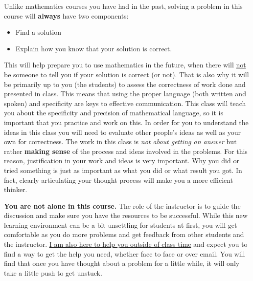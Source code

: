 Unlike mathematics courses you have had in the past, solving a problem in this course will \textbf{always} have two components:
\begin{itemize}
\item Find a solution
\item Explain how you know that your solution is correct.
\end{itemize}
This will help prepare you to use mathematics in the future, when there will \underline{not} be someone to tell you if your solution is correct (or not). That is also why it will be primarily up to you (the students) to assess the correctness of work done and presented in class. This means that using the proper language (both written and spoken) and specificity are keys to effective communication. This class will teach you about the specificity and precision of mathematical language, so it is important that you practice and work on this. In order for you to understand the ideas in this class you will need to evaluate other people's ideas as well as your own for correctness. The work in this class is \emph{not about getting an answer} but rather \textbf{making sense} of the process and ideas involved in the problems. For this reason, justification in your work and ideas is very important. Why you did or tried something is just as important as what you did or what result you got. In fact, clearly articulating your thought process will make you a more efficient thinker.

\textbf{You are not alone in this course.} The role of the instructor is to guide the discussion and make sure you have the resources to be successful. While this new learning environment can be a bit unsettling for students at first, you will get comfortable as you do more problems and get feedback from other students and the instructor. \underline{I am also here to help you outside of class time} and expect you to find a way to get the help you need, whether face to face or over email. You will find that once you have thought about a problem for a little while, it will only take a little push to get unstuck.

